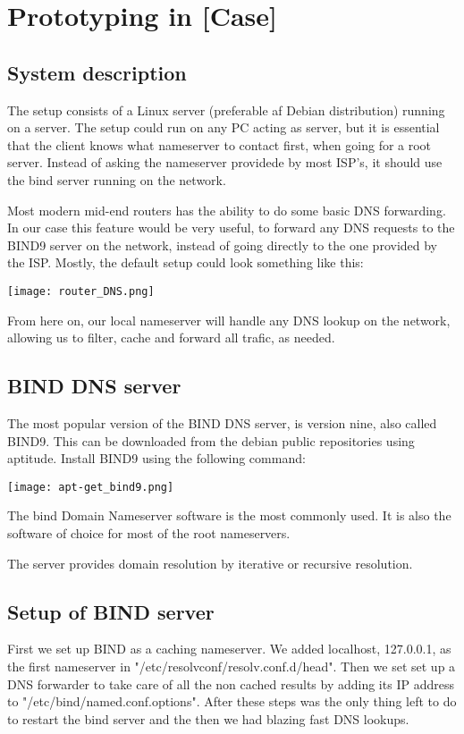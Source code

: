 \chapter{Prototyping in [Case]}

\section{System description}
The setup consists of a Linux server (preferable af Debian distribution) running on a server. The setup could run on any PC acting as server, but it is essential that the client knows what nameserver to contact first, when going for a root server. Instead of asking the nameserver providede by most ISP's, it should use the bind server running on the network.

Most modern mid-end routers has the ability to do some basic DNS forwarding. In our case this feature would be very useful, to forward any DNS requests to the BIND9 server on the network, instead of going directly to the one provided by the ISP. Mostly, the default setup could look something like this:

\begin{center}
	\texttt{[image: router\_DNS.png]}
\end{center}

From here on, our local nameserver will handle any DNS lookup on the network, allowing us to filter, cache and forward all trafic, as needed.

\section{BIND DNS server}
The most popular version of the BIND DNS server, is version nine, also called BIND9. This can be downloaded from the debian public repositories using aptitude. Install BIND9 using the following command:

\begin{center}
	\texttt{[image: apt-get\_bind9.png]}
\end{center}

The bind Domain Nameserver software is the most commonly used. It is also the software of choice for most of the root nameservers.

The server provides domain resolution by iterative or recursive resolution.

\section{Setup of BIND server}
First we set up BIND as a caching nameserver. We added localhost, 127.0.0.1, as the first nameserver in "/etc/resolvconf/resolv.conf.d/head". Then we set set up a DNS forwarder to take care of all the non cached results by adding its IP address to "/etc/bind/named.conf.options". After these steps was the only thing left to do to restart the bind server and the then we had blazing fast DNS lookups.


